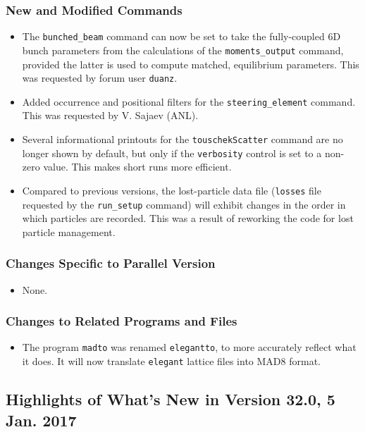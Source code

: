 \documentclass[11pt]{article}
\begin{document}
\subsubsection{New and Modified Commands}
\begin{itemize}
\item The \verb|bunched_beam| command can now be set to take the fully-coupled 6D bunch parameters from the calculations of the
  \verb|moments_output| command, provided the latter is used to compute matched, equilibrium parameters.
  This was requested by forum user \verb|duanz|.
\item Added occurrence and positional filters for the \verb|steering_element| command. This was requested by V. Sajaev (ANL).
\item Several informational printouts for the \verb|touschekScatter| command are no longer shown by default, but only if the 
  \verb|verbosity| control is set to a non-zero value. This makes short runs more efficient.
\item Compared to previous versions, the lost-particle data file (\verb|losses| file requested by the \verb|run_setup|
  command) will exhibit changes in the order in which particles are recorded. This was a result of reworking the code for
  lost particle management.
\end{itemize}

\subsubsection{Changes Specific to Parallel Version}

\begin{itemize}
\item None.
\end{itemize}

\subsubsection{Changes to Related Programs and Files}

\begin{itemize}
\item The program \verb|madto| was renamed \verb|elegantto|, to more accurately reflect what it does.
  It will now translate \verb|elegant| lattice files into MAD8 format.
\end{itemize}

\subsection{Highlights of What's New in Version 32.0, 5 Jan. 2017}
\end{document}
